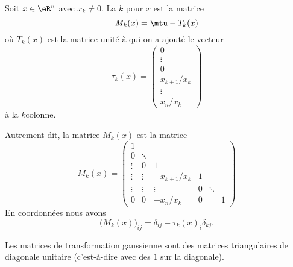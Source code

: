 \begin{definition}
    Soit \( x\in \eR^n\) avec \( x_k\neq 0\). La \( k\)\ieme {} pour \( x\) est la matrice
    \begin{equation}
        M_k(x)=\mtu-T_k(x)
    \end{equation}
    où \( T_k(x)\) est la matrice unité à qui on a ajouté le vecteur
    \begin{equation}
        \tau_k(x)=
        \begin{pmatrix}
            0    \\
            \vdots    \\
            0    \\
            x_{k+1}/x_k    \\
            \vdots    \\
            x_n/x_k
        \end{pmatrix}
    \end{equation}
    à la \( k\)\ieme colonne.
\end{definition}
Autrement dit, la matrice \( M_k(x)\) est la matrice
\begin{equation}        \label{EQooMWXLooBDtsKS}
    M_k(x)=\begin{pmatrix}
        1    &       &       &       &       &   \\
        0    &    \ddots    &                 &       &       &   \\
        \vdots    &   0    &   1               &         &       &   \\
        \vdots    & \vdots      &   -x_{k+1}/x_k    &   1    &       &   \\
        \vdots    &   \vdots    &   \vdots    &   0    &   \ddots    &   \\
        0    &   0    &           -x_n/x_k   &  0   &      &   1
    \end{pmatrix}
\end{equation}
En coordonnées nous avons
\begin{equation}
    \big( M_k(x)\big)_{ij}=\delta_{ij}-\tau_k(x)_i\delta_{kj}.
\end{equation}

\begin{normaltext}
    Les matrices de transformation gaussienne sont des matrices triangulaires de diagonale unitaire (c'est-à-dire avec des \( 1\) sur la diagonale).
\end{normaltext}

